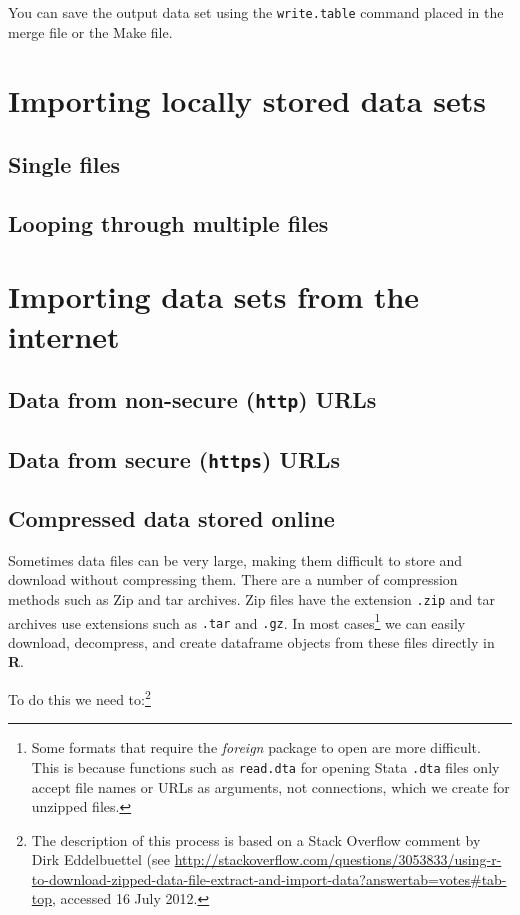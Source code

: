 \documentclass[ChapterTOCs,krantz1]{krantz}\usepackage{graphicx, color}
\begin{document}
You can save the output data set using the {\tt{write.table}} command placed in the merge file or the Make file.

\section{Importing locally stored data sets}

\subsection{Single files}

\subsection{Looping through multiple files}

\section{Importing data sets from the internet}

\subsection{Data from non-secure ({\tt{http}}) URLs}

\subsection{Data from secure ({\tt{https}}) URLs}

\subsection{Compressed data stored online}

Sometimes data files can be very large, making them difficult to store and download without compressing them. There are a number of compression methods such as Zip and tar archives. Zip files have the extension {\tt{.zip}} and tar archives use extensions such as {\tt{.tar}} and {\tt{.gz}}. In most cases\footnote{Some formats that require the {\emph{foreign}} package to open are more difficult. This is because functions such as {\tt{read.dta}} for opening Stata {\tt{.dta}} files only accept file names or URLs as arguments, not connections, which we create for unzipped files.} we can easily download, decompress, and create dataframe objects from these files directly in {\bf{R}}. 

To do this we need to:\footnote{The description of this process is based on a Stack Overflow comment by Dirk Eddelbuettel (see {\url{http://stackoverflow.com/questions/3053833/using-r-to-download-zipped-data-file-extract-and-import-data?answertab=votes\#tab-top}}, accessed 16 July 2012.}
\end{document}
